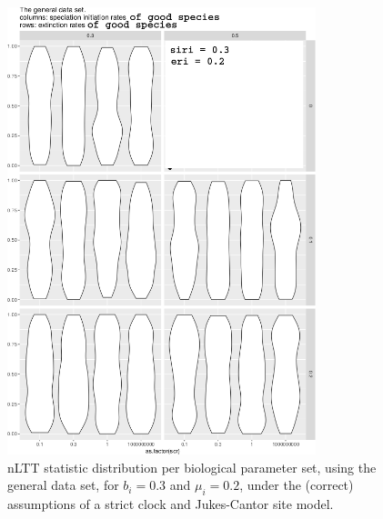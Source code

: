 \documentclass{article}
\begin{document}
\begin{figure}[!htbp]
  \includegraphics[width=0.8\textwidth]{fig_general_3.png}
  \caption{
    nLTT statistic distribution per biological parameter set, using the
    general data set, 
    for $b_i = 0.3$ and $\mu_i = 0.2$, 
    under the (correct) assumptions of a strict clock and Jukes-Cantor site model.
  }
\end{figure}
\end{document}

